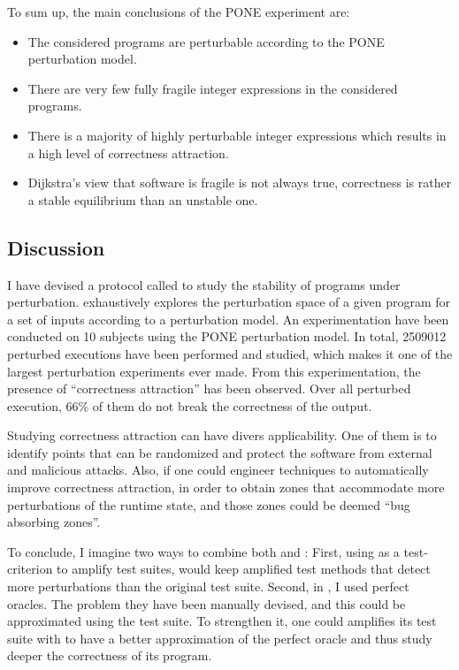 \begin{mdframed}
To sum up, the main conclusions of the PONE experiment are:
\begin{itemize}
	\item The considered programs are perturbable according to the PONE perturbation model.
	\item There are very few fully fragile integer expressions in the considered programs.
	\item There is a majority of highly perturbable integer expressions which results in a high level of correctness attraction.
	\item Dijkstra's view that software is fragile is not always true, correctness is rather a stable equilibrium than an unstable one.
\end{itemize}
\end{mdframed}

\subsection{Discussion}
\label{subsec:transversal-contributions:correctness:conclusion}

I have devised a protocol called \perturb to study the stability of programs under perturbation.
\perturb exhaustively explores the perturbation space of a given program for a set of inputs according to a perturbation model.
An experimentation have been conducted on 10 subjects using the PONE perturbation model.
In total, 2509012 perturbed executions have been performed and studied, which makes it one of the largest perturbation experiments ever made.
From this experimentation, the presence of ``correctness attraction'' has been observed. Over all perturbed execution, 66\% of them do not break the correctness of the output. 

Studying correctness attraction can have divers applicability.
One of them is to identify points that can be randomized and protect the software from external and malicious attacks.
Also, if one could engineer techniques to automatically improve correctness attraction, in order to obtain zones that accommodate more perturbations of the runtime state, and those zones could be deemed ``bug absorbing zones''.

To conclude, I imagine two ways to combine both \dspot and \perturb:
First, using \perturb as a test-criterion to amplify test suites, \ie \dspot would keep amplified test methods that detect more perturbations than the original test suite.
Second, in \perturb, I used perfect oracles.
The problem they have been manually devised, and this could be approximated using the test suite.
To strengthen it, one could amplifies its test suite with \dspot to have a better approximation of the perfect oracle and thus study deeper the correctness of its program.

